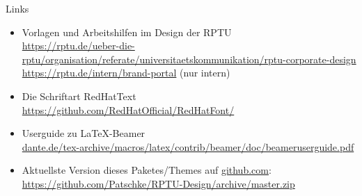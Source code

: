 \documentclass[german,10pt,compress]{beamer}
\begin{document}
\begin{frame}{Links}
	\begin{itemize}
		\item Vorlagen und Arbeitshilfen im Design der RPTU\\ \href{https://rptu.de/ueber-die-rptu/organisation/referate/universitaetskommunikation/rptu-corporate-design}{https://rptu.de/ueber-die-rptu/organisation/referate/universitaetskommunikation/rptu-corporate-design}\\
		      \href{https://rptu.de/intern/brand-portal}{https://rptu.de/intern/brand-portal} (nur intern)
		\item Die Schriftart RedHatText\\
		      \href{https://github.com/RedHatOfficial/RedHatFont/}{https://github.com/RedHatOfficial/RedHatFont/}
		\item Userguide zu \LaTeX-Beamer\\ \href{ftp://ftp.dante.de/tex-archive/macros/latex/contrib/beamer/doc/beameruserguide.pdf}{dante.de/tex-archive/macros/latex/contrib/beamer/doc/beameruserguide.pdf}
		\item Aktuellste Version dieses Paketes/Themes auf \href{http://github.com}{github.com}:\\
		      \href{https://github.com/Patschke/RPTU-Design/archive/master.zip}{https://github.com/Patschke/RPTU-Design/archive/master.zip}
	\end{itemize}
\end{frame}
\end{document}
